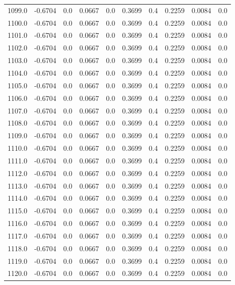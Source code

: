 \begin{longtable}{lrrrrrrrrr}
1099.0 & -0.6704 & 0.0 & 0.0667 & 0.0 & 0.3699 & 0.4 & 0.2259 & 0.0084 & 0.0 \\
1100.0 & -0.6704 & 0.0 & 0.0667 & 0.0 & 0.3699 & 0.4 & 0.2259 & 0.0084 & 0.0 \\
1101.0 & -0.6704 & 0.0 & 0.0667 & 0.0 & 0.3699 & 0.4 & 0.2259 & 0.0084 & 0.0 \\
1102.0 & -0.6704 & 0.0 & 0.0667 & 0.0 & 0.3699 & 0.4 & 0.2259 & 0.0084 & 0.0 \\
1103.0 & -0.6704 & 0.0 & 0.0667 & 0.0 & 0.3699 & 0.4 & 0.2259 & 0.0084 & 0.0 \\
1104.0 & -0.6704 & 0.0 & 0.0667 & 0.0 & 0.3699 & 0.4 & 0.2259 & 0.0084 & 0.0 \\
1105.0 & -0.6704 & 0.0 & 0.0667 & 0.0 & 0.3699 & 0.4 & 0.2259 & 0.0084 & 0.0 \\
1106.0 & -0.6704 & 0.0 & 0.0667 & 0.0 & 0.3699 & 0.4 & 0.2259 & 0.0084 & 0.0 \\
1107.0 & -0.6704 & 0.0 & 0.0667 & 0.0 & 0.3699 & 0.4 & 0.2259 & 0.0084 & 0.0 \\
1108.0 & -0.6704 & 0.0 & 0.0667 & 0.0 & 0.3699 & 0.4 & 0.2259 & 0.0084 & 0.0 \\
1109.0 & -0.6704 & 0.0 & 0.0667 & 0.0 & 0.3699 & 0.4 & 0.2259 & 0.0084 & 0.0 \\
1110.0 & -0.6704 & 0.0 & 0.0667 & 0.0 & 0.3699 & 0.4 & 0.2259 & 0.0084 & 0.0 \\
1111.0 & -0.6704 & 0.0 & 0.0667 & 0.0 & 0.3699 & 0.4 & 0.2259 & 0.0084 & 0.0 \\
1112.0 & -0.6704 & 0.0 & 0.0667 & 0.0 & 0.3699 & 0.4 & 0.2259 & 0.0084 & 0.0 \\
1113.0 & -0.6704 & 0.0 & 0.0667 & 0.0 & 0.3699 & 0.4 & 0.2259 & 0.0084 & 0.0 \\
1114.0 & -0.6704 & 0.0 & 0.0667 & 0.0 & 0.3699 & 0.4 & 0.2259 & 0.0084 & 0.0 \\
1115.0 & -0.6704 & 0.0 & 0.0667 & 0.0 & 0.3699 & 0.4 & 0.2259 & 0.0084 & 0.0 \\
1116.0 & -0.6704 & 0.0 & 0.0667 & 0.0 & 0.3699 & 0.4 & 0.2259 & 0.0084 & 0.0 \\
1117.0 & -0.6704 & 0.0 & 0.0667 & 0.0 & 0.3699 & 0.4 & 0.2259 & 0.0084 & 0.0 \\
1118.0 & -0.6704 & 0.0 & 0.0667 & 0.0 & 0.3699 & 0.4 & 0.2259 & 0.0084 & 0.0 \\
1119.0 & -0.6704 & 0.0 & 0.0667 & 0.0 & 0.3699 & 0.4 & 0.2259 & 0.0084 & 0.0 \\
1120.0 & -0.6704 & 0.0 & 0.0667 & 0.0 & 0.3699 & 0.4 & 0.2259 & 0.0084 & 0.0 \\

\end{longtable}
